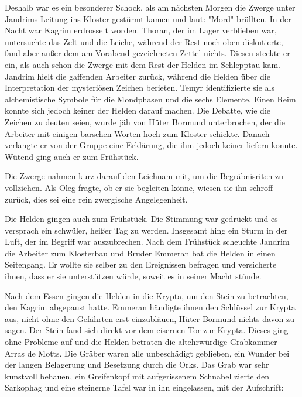 Deshalb war es ein besonderer Schock, als am nächsten Morgen die Zwerge unter Jandrims Leitung ins Kloster gestürmt kamen und laut: "Mord" brüllten. In der Nacht war Kagrim erdrosselt worden. Thoran, der im Lager verblieben war, untersuchte das Zelt und die Leiche, während der Rest noch oben diskutierte, fand aber außer dem am Vorabend gezeichneten Zettel nichts. Diesen steckte er ein, als auch schon die Zwerge mit dem Rest der Helden im Schlepptau kam. Jandrim hielt die gaffenden Arbeiter zurück, während die Helden über die Interpretation der mysteriösen Zeichen berieten. Temyr identifizierte sie als alchemistische Symbole für die Mondphasen und die sechs Elemente. Einen Reim konnte sich jedoch keiner der Helden darauf machen. Die Debatte, wie die Zeichen zu deuten seien, wurde jäh von Hüter Bormund unterbrochen, der die Arbeiter mit einigen barschen Worten hoch zum Kloster schickte. Danach verlangte er von der Gruppe eine Erklärung, die ihm jedoch keiner liefern konnte. Wütend ging auch er zum Frühstück.\par
Die Zwerge nahmen kurz darauf den Leichnam mit, um die Begräbnisriten zu vollziehen. Als Oleg fragte, ob er sie begleiten könne, wiesen sie ihn schroff zurück, dies sei eine rein zwergische Angelegenheit.\par
Die Helden gingen auch zum Frühstück. Die Stimmung war gedrückt und es versprach ein schwüler, heißer Tag zu werden. Insgesamt hing ein Sturm in der Luft, der im Begriff war auszubrechen. Nach dem Frühstück scheuchte Jandrim die Arbeiter zum Klosterbau und Bruder Emmeran bat die Helden in einen Seitengang. Er wollte sie selber zu den Ereignissen befragen und versicherte ihnen, dass er sie unterstützen würde, soweit es in seiner Macht stünde.\par
Nach dem Essen gingen die Helden in die Krypta, um den Stein zu betrachten, den Kagrim abgepaust hatte. Emmeran händigte ihnen den Schlüssel zur Krypta aus, nicht ohne den Gefährten erst einzubläuen, Hüter Bormund nichts davon zu sagen. Der Stein fand sich direkt vor dem eisernen Tor zur Krypta. Dieses ging ohne Probleme auf und die Helden betraten die altehrwürdige Grabkammer Arras de Motts. Die Gräber waren alle unbeschädigt geblieben, ein Wunder bei der langen Belagerung und Besetzung durch die Orks. Das Grab war sehr kunstvoll behauen, ein Greifenkopf mit aufgerissenem Schnabel zierte den Sarkophag und eine steinerne Tafel war in ihn eingelassen, mit der Aufschrift:\par

